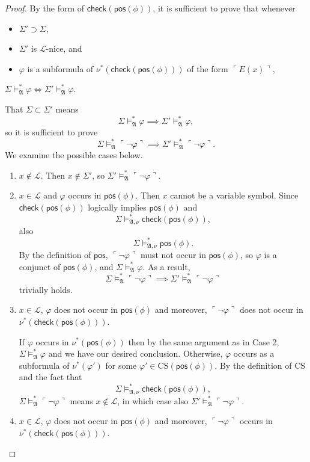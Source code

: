 \documentclass[12pt]{article}
\numberwithin{equation}{section}
\begin{document}
\begin{proof}
By the form of $\mathsf{check}(\mathsf{pos}(\phi))$, it is sufficient to prove that whenever 
\begin{itemize}
    \item $\Sigma' \supset \Sigma$,
    \item $\Sigma'$ is $\mathcal{L}$-nice, and
    \item $\varphi$ is a subformula of $\nu^*(\mathsf{check}(\mathsf{pos}(\phi)))$ of the form $\ulcorner E(x) \urcorner$,
\end{itemize}
 $\Sigma \models^*_{\mathfrak{A}} \varphi \iff \Sigma' \models^*_{\mathfrak{A}} \varphi$. 
 
 That $\Sigma \subset \Sigma'$ means $$\Sigma \models^*_{\mathfrak{A}} \varphi \implies \Sigma' \models^*_{\mathfrak{A}} \varphi,$$ so it is sufficient to prove $$\Sigma \models^*_{\mathfrak{A}} \ulcorner \neg \varphi \urcorner \implies \Sigma' \models^*_{\mathfrak{A}} \ulcorner \neg \varphi \urcorner.$$ We examine the possible cases below.
\begin{enumerate}[label=Case \arabic*:, leftmargin=50pt]
    \item $x \not\in \mathcal{L}$. Then $x \not\in \Sigma'$, so $\Sigma' \models^*_{\mathfrak{A}} \ulcorner \neg \varphi \urcorner$.
    \item $x \in \mathcal{L}$ and $\varphi$ occurs in $\mathsf{pos}(\phi)$. Then $x$ cannot be a variable symbol. Since $\mathsf{check}(\mathsf{pos}(\phi))$ logically implies $\mathsf{pos}(\phi)$ and $$\Sigma \models^*_{\mathfrak{A}, \nu} \mathsf{check}(\mathsf{pos}(\phi)),$$ also $$\Sigma \models^*_{\mathfrak{A}, \nu} \mathsf{pos}(\phi).$$ By the definition of $\mathsf{pos}$, $\ulcorner \neg \varphi \urcorner$ must not occur in $\mathsf{pos}(\phi)$, so $\varphi$ is a conjunct of $\mathsf{pos}(\phi)$, and $\Sigma \models^*_{\mathfrak{A}} \varphi$. As a result, $$\Sigma \models^*_{\mathfrak{A}} \ulcorner \neg \varphi \urcorner \implies \Sigma' \models^*_{\mathfrak{A}} \ulcorner \neg \varphi \urcorner$$ trivially holds.
    \item $x \in \mathcal{L}$, $\varphi$ does not occur in $\mathsf{pos}(\phi)$ and moreover, $\ulcorner \neg \varphi \urcorner$ does not occur in $\nu^*(\mathsf{check}(\mathsf{pos}(\phi)))$. 
    
    If $\varphi$ occurs in $\nu^*(\mathsf{pos}(\phi))$ then by the same argument as in Case 2, $\Sigma \models^*_{\mathfrak{A}} \varphi$ and we have our desired conclusion. Otherwise, $\varphi$ occurs as a subformula of $\nu^*(\varphi')$ for some $\varphi' \in \mathrm{CS}(\mathsf{pos}(\phi))$. By the definition of $\mathrm{CS}$ and the fact that $$\Sigma \models^*_{\mathfrak{A}, \nu} \mathsf{check}(\mathsf{pos}(\phi)),$$ $\Sigma \models^*_{\mathfrak{A}} \ulcorner \neg \varphi \urcorner$ means $x \not \in \mathcal{L}$, in which case also $\Sigma' \models^*_{\mathfrak{A}} \ulcorner \neg \varphi \urcorner$.
    \item $x \in \mathcal{L}$, $\varphi$ does not occur in $\mathsf{pos}(\phi)$ and moreover, $\ulcorner \neg \varphi \urcorner$ occurs in \\ $\nu^*(\mathsf{check}(\mathsf{pos}(\phi)))$. 
    

\end{enumerate}
\end{proof}
\end{document}
